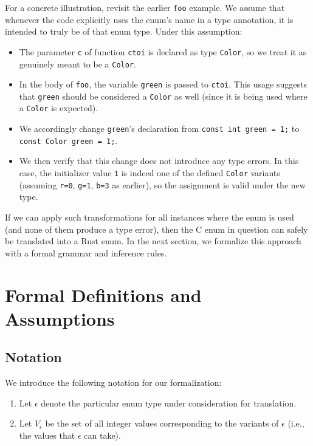 \documentclass[10pt,conference]{IEEEtran}
\begin{document}
For a concrete illustration, revisit the earlier \texttt{foo} example. We assume that whenever the code explicitly uses the enum's name in a type annotation, it is intended to truly be of that enum type. Under this assumption:
\begin{itemize}
    \item The parameter \texttt{c} of function \texttt{ctoi} is declared as type \texttt{Color}, so we treat it as genuinely meant to be a \texttt{Color}.
    \item In the body of \texttt{foo}, the variable \texttt{green} is passed to \texttt{ctoi}. This usage suggests that \texttt{green} should be considered a \texttt{Color} as well (since it is being used where a \texttt{Color} is expected).
    \item We accordingly change \texttt{green}'s declaration from \texttt{const int green = 1;} to \texttt{const Color green = 1;}.
    \item We then verify that this change does not introduce any type errors. In this case, the initializer value \texttt{1} is indeed one of the defined \texttt{Color} variants (assuming \texttt{r=0}, \texttt{g=1}, \texttt{b=3} as earlier), so the assignment is valid under the new type.
\end{itemize}

If we can apply such transformations for all instances where the enum is used (and none of them produce a type error), then the C enum in question can safely be translated into a Rust enum. In the next section, we formalize this approach with a formal grammar and inference rules.

\section{Formal Definitions and Assumptions}

\subsection{Notation}

We introduce the following notation for our formalization:
\begin{enumerate}
    \item Let $\epsilon$ denote the particular enum type under consideration for translation.
    \item Let $V_\epsilon$ be the set of all integer values corresponding to the variants of $\epsilon$ (i.e., the values that $\epsilon$ can take).
\end{enumerate}
\end{document}
